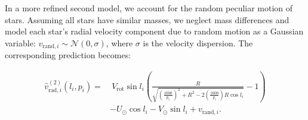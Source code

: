 In a more refined second model, we account for the random peculiar motion of stars. Assuming all stars have similar masses, we neglect mass differences and model each star's radial velocity component due to random motion as a Gaussian variable: $v_{\text{rand},i} \sim \mathcal{N}(0, \sigma)$, where $\sigma$ is the velocity dispersion. The corresponding prediction becomes:

\begin{equation}\label{eq:VradModel2}
    \begin{aligned}
        \hat{v}_{\text{rad},i}^{(2)}(l_i, p_i) = &~V_{\text{rot}} \sin l_i \left( \frac{R}{\sqrt{\left(\frac{1000}{p_i}\right)^2 + R^2 - 2 \left(\frac{1000}{p_i}\right) R \cos l_i}} - 1 \right) \\
        &- U_{\odot} \cos l_i - V_{\odot} \sin l_i + v_{\text{rand},i}.
    \end{aligned}
\end{equation}

